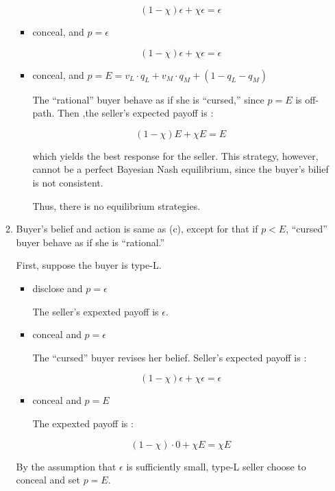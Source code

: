 \documentclass{jsarticle}
\begin{document}
\begin{enumerate}
\begin{enumerate}
\begin{itemize}
   \[ (1 - \chi ) \epsilon + \chi \epsilon = \epsilon \]
   
   \item conceal, and $p = \epsilon$
   
   \[ (1 - \chi) \epsilon + \chi \epsilon = \epsilon \]
   
   \item conceal, and $p = E = v_L \cdot q_L + v_M \cdot q_M + (1 - q_L - q_M)$
   
   The ``rational'' buyer behave as if she is ``cursed,'' since $p=E$ is off-path. Then ,the seller's expected payoff is :
   
   \[(1- \chi ) E + \chi E = E \]
   
   which yields the best response for the seller. This strategy, however, cannot be a perfect Bayesian Nash equilibrium, since the buyer's bilief is not consistent.
   
   Thus, there is no equilibrium strategies.
   
   \end{itemize}
 
 \vspace{1zw} 
 \item Buyer's belief and action is same as (c), except for that if $p < E$, ``cursed'' buyer behave as if she is ``rational.''
 
 First, suppose the buyer is type-L.
 
  \begin{itemize}
  
  \item disclose and $p = \epsilon$
  
  The seller's expexted payoff is $\epsilon$.
  
  \item conceal and $p = \epsilon$
  
  The ``cursed'' buyer revises her belief. Seller's expected payoff is :
  
  \[ (1 - \chi) \epsilon + \chi \epsilon = \epsilon \]
  
  \item conceal and $p = E$
  
  The expexted payoff is :
  
  \[ (1 - \chi) \cdot 0 + \chi E = \chi E \]
  
  \end{itemize}
 
 By the assumption that $\epsilon$ is sufficiently small, type-L seller choose to conceal and set $p = E$.
 

\end{enumerate}
\end{enumerate}
\end{document}
